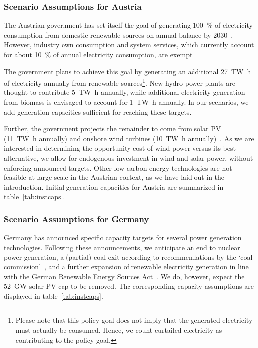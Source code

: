 \documentclass[review, 3p, times, 12pt]{elsarticle} %
\begin{document}
\subsubsection{Scenario Assumptions for Austria}\label{subsubsec:assumptions-austria}
The Austrian government has set itself the goal of generating \SI{100}{\percent} of electricity consumption from domestic renewable sources on annual balance by 2030~\citep{Regierungsprogramm2020}.
However, industry own consumption and system services, which currently account for about \SI{10}{\percent} of annual electricity consumption, are exempt.

The government plans to achieve this goal by generating an additional \SI{27}{\tera\watt\hour} of electricity annually from renewable sources\footnote{Please note that this policy goal does not imply that the generated
electricity must actually be consumed. Hence, we count curtailed electricity as contributing to the policy goal.}.
New hydro power plants are thought to contribute \SI{5}{\tera\watt\hour} annually, while additional electricity generation from biomass is envisaged to account for \SI{1}{\tera\watt\hour} annually.
In our scenarios, we add generation capacities sufficient for reaching these targets.

Further, the government projects the remainder to come from solar PV (\SI{11}{\tera\watt\hour} annually) and onshore wind turbines (\SI{10}{\tera\watt\hour} annually)~\cite{Regierungsprogramm2020}.
As we are interested in determining the opportunity cost of wind power versus its best alternative, we allow for endogenous investment in wind and solar power, without enforcing announced targets.
Other low-carbon energy technologies are not feasible at large scale in the Austrian context, as we have laid out in the introduction.
Initial generation capacities for Austria are summarized in table~\ref{tab:instcaps}.

\subsubsection{Scenario Assumptions for Germany}\label{subsubsec:assumptions-germany}
Germany has announced specific capacity targets for several power generation technologies.
Following these announcements, we anticipate an end to nuclear power generation, a (partial) coal exit according to
recommendations by the `coal commission'~\cite{WSB2019}, and a further expansion of renewable electricity generation
in line with the German Renewable Energy Sources Act~\cite{noauthor_renewable_2017}.
We do, however, expect the \SI{52}{\giga\watt} solar PV cap to be removed.
The corresponding capacity assumptions are displayed in table~\ref{tab:instcaps}.
\end{document}
